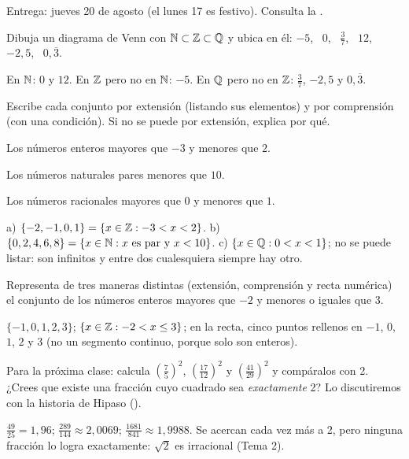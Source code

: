 \documentclass[11pt]{article}
\begin{document}
\encabezado

\begin{instrucciones}
Entrega: jueves 20 de agosto (el lunes 17 es festivo). Consulta la .
\end{instrucciones}

\begin{preguntas}

\pregunta Dibuja un diagrama de Venn con $\mathbb{N} \subset \mathbb{Z} \subset \mathbb{Q}$ y ubica en él:
$-5$, \ $0$, \ $\frac{3}{7}$, \ $12$, \ $-2{,}5$, \ $0{,}\overline{3}$.
\espacio{4cm}
\begin{solucion}
En $\mathbb{N}$: $0$ y $12$. En $\mathbb{Z}$ pero no en $\mathbb{N}$: $-5$. En $\mathbb{Q}$ pero no en $\mathbb{Z}$: $\frac{3}{7}$,
$-2{,}5$ y $0{,}\overline{3}$.
\end{solucion}

\pregunta Escribe cada conjunto por extensión (listando sus elementos) y por comprensión
(con una condición). Si no se puede por extensión, explica por qué.
\begin{opciones}
  \item Los números enteros mayores que $-3$ y menores que $2$.
  \item Los números naturales pares menores que $10$.
  \item Los números racionales mayores que $0$ y menores que $1$.
\end{opciones}
\begin{solucion}[4cm]
a) $\{-2, -1, 0, 1\} = \{x \in \mathbb{Z} : -3 < x < 2\}$. b) $\{0, 2, 4, 6, 8\} =
\{x \in \mathbb{N} : x \text{ es par y } x < 10\}$. c) $\{x \in \mathbb{Q} : 0 < x < 1\}$; no se puede
listar: son infinitos y entre dos cualesquiera siempre hay otro.
\end{solucion}

\pregunta Representa de tres maneras distintas (extensión, comprensión y recta numérica) el
conjunto de los números enteros mayores que $-2$ y menores o iguales que $3$.
\espacio{3.5cm}
\begin{solucion}
$\{-1, 0, 1, 2, 3\}$; $\{x \in \mathbb{Z} : -2 < x \le 3\}$; en la recta, cinco puntos rellenos en
$-1$, $0$, $1$, $2$ y $3$ (no un segmento continuo, porque solo son enteros).
\end{solucion}

\pregunta Para la próxima clase: calcula $\left(\frac{7}{5}\right)^2$,
$\left(\frac{17}{12}\right)^2$ y $\left(\frac{41}{29}\right)^2$ y compáralos con 2. ¿Crees que
existe una fracción cuyo cuadrado sea \emph{exactamente} 2? Lo discutiremos con la historia de
Hipaso ().
\begin{solucion}
$\frac{49}{25} = 1{,}96$; $\frac{289}{144} \approx 2{,}0069$; $\frac{1681}{841} \approx
1{,}9988$. Se acercan cada vez más a 2, pero ninguna fracción lo logra exactamente: $\sqrt{2}$
es irracional (Tema 2).
\end{solucion}

\end{preguntas}
\end{document}
